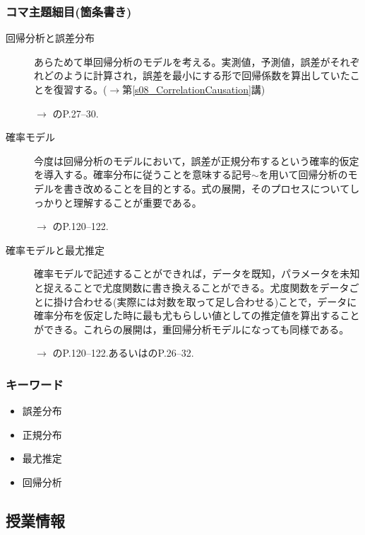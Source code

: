 \subsubsection{コマ主題細目(箇条書き)}
\begin{description}

	\item[回帰分析と誤差分布]あらためて単回帰分析のモデルを考える。実測値，予測値，誤差がそれぞれどのように計算され，誤差を最小にする形で回帰係数を算出していたことを復習する。($\to$第\ref{s08_CorrelationCausation}講)
	      \begin{flushright}
		      $\to$ \citet{Toyoda201706}のP.27--30.
	      \end{flushright}

	\item[確率モデル]今度は回帰分析のモデルにおいて，誤差が正規分布するという確率的仮定を導入する。確率分布に従うことを意味する記号$\sim$を用いて回帰分析のモデルを書き改めることを目的とする。式の展開，そのプロセスについてしっかりと理解することが重要である。
	      \begin{flushright}
		      $\to$ \citet{kosugi2018}のP.120--122.
	      \end{flushright}

	\item[確率モデルと最尤推定]確率モデルで記述することができれば，データを既知，パラメータを未知と捉えることで尤度関数に書き換えることができる。尤度関数をデータごとに掛け合わせる(実際には対数を取って足し合わせる)ことで，データに確率分布を仮定した時に最も尤もらしい値としての推定値を算出することができる。これらの展開は，重回帰分析モデルになっても同様である。
	      \begin{flushright}
		      $\to$ \citet{kosugi2018}のP.120--122.あるいは\citet{Hamada201912}のP.26--32.
	      \end{flushright}

\end{description}
\subsubsection{キーワード}
\begin{itemize}
	\item 誤差分布
	\item 正規分布
	\item 最尤推定
	\item 回帰分析
\end{itemize}
\subsection{授業情報}
